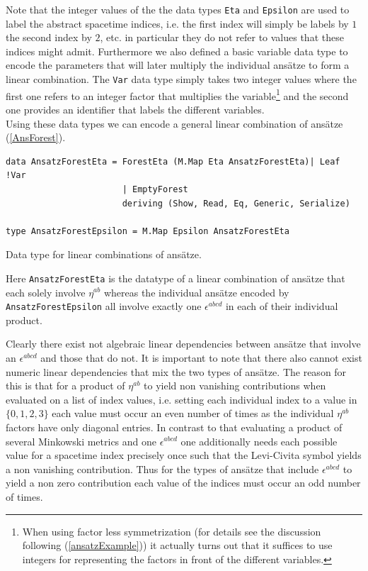 \documentclass[a4paper,12pt, DIV=14, BCOR=5mm, twoside, headsepline, numbers=noenddot]{scrbook}
\begin{document}
Note that the integer values of the the data types \texttt{Eta} and \texttt{Epsilon} are used to label the abstract spacetime indices, i.e. the first index will simply be labels by $1$ the second index by $2$, etc. in particular they do not refer to values that these indices might admit.
Furthermore we also defined a basic variable data type to encode the parameters that will later multiply the individual ansätze to form a linear combination. The \texttt{Var}
data type simply takes two integer values where the first one refers to an integer factor that multiplies the variable\footnote{When using factor less symmetrization (for details see the discussion following (\ref{ansatzExample})) it actually turns out that it suffices to use integers for representing the factors in front of the different variables.} and the second one provides an identifier that labels the different variables. \\

Using these data types we can encode a general linear combination of ansätze (\ref{AnsForest}).

\begin{listing}[hbt!] 
\begin{verbatim}
data AnsatzForestEta = ForestEta (M.Map Eta AnsatzForestEta)| Leaf !Var
                       | EmptyForest 
                       deriving (Show, Read, Eq, Generic, Serialize)

type AnsatzForestEpsilon = M.Map Epsilon AnsatzForestEta
\end{verbatim} 
\caption{Data type for linear combinations of ansätze.}\label{AnsForest}
\end{listing}

Here \texttt{AnsatzForestEta} is the datatype of a linear combination of ansätze that each solely involve $\eta^{ab}$ whereas the individual ansätze encoded by \texttt{AnsatzForestEpsilon} all involve exactly one $\epsilon^{abcd}$ in each of their individual product.

Clearly there exist not algebraic linear dependencies between ansätze that involve an $\epsilon^{abcd}$ and those that do not. 
It is important to note that there also cannot exist numeric linear dependencies that mix the two types of ansätze. The reason for this is that for a product of $\eta^{ab}$ to yield non vanishing contributions when evaluated on a list of index values, i.e. setting each individual index to a value in $\{0,1,2,3 \}$ each value must occur an even number of times as the individual $\eta^{ab}$ factors have only diagonal entries. In contrast to that evaluating a product of several Minkowski metrics and one $\epsilon^{abcd}$ one additionally needs each possible value for a spacetime index precisely once such that the Levi-Civita symbol yields a non vanishing contribution. Thus for the types of ansätze that include $\epsilon^{abcd}$ to yield a non zero contribution each value of the indices must occur an odd number of times.
\end{document}
